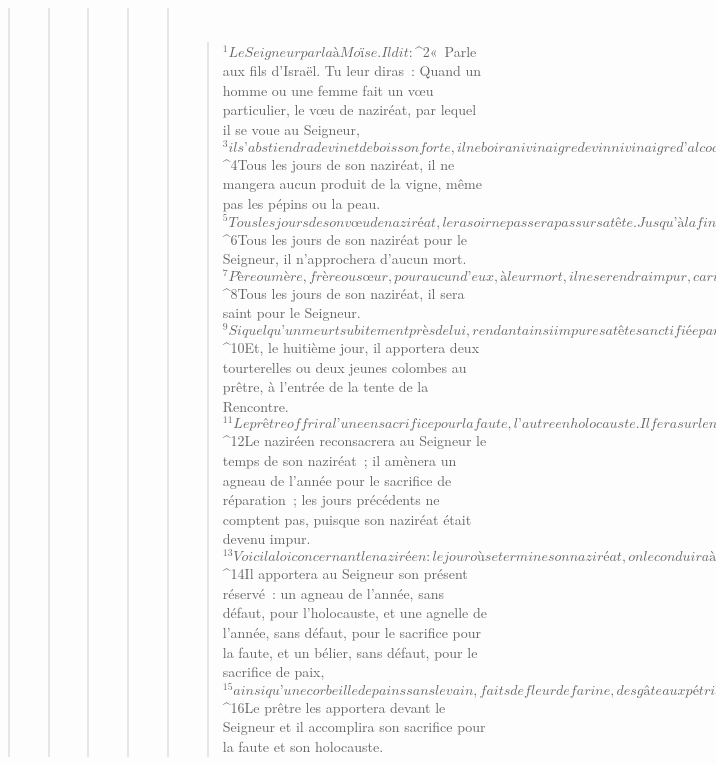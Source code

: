 \begin{verse}
\begin{verse}
\begin{verse}
\begin{verse}
\begin{verse}
         
      \bchapter{}
      \begin{verse}
${}^{1}Le Seigneur parla à Moïse. Il dit : 
${}^{2}« Parle aux fils d’Israël. Tu leur diras : Quand un homme ou une femme fait un vœu particulier, le vœu de naziréat, par lequel il se voue au Seigneur, 
${}^{3}il s’abstiendra de vin et de boisson forte, il ne boira ni vinaigre de vin ni vinaigre d’alcool, il ne boira aucun jus de raisin, il ne mangera ni raisins frais ni raisins secs. 
${}^{4}Tous les jours de son naziréat, il ne mangera aucun produit de la vigne, même pas les pépins ou la peau. 
${}^{5}Tous les jours de son vœu de naziréat, le rasoir ne passera pas sur sa tête. Jusqu’à la fin de cette période de naziréat, il sera saint pour le Seigneur, il laissera pousser librement sa chevelure. 
${}^{6}Tous les jours de son naziréat pour le Seigneur, il n’approchera d’aucun mort. 
${}^{7}Père ou mère, frère ou sœur, pour aucun d’eux, à leur mort, il ne se rendra impur, car il porte sur la tête le signe de la consécration à son Dieu.
${}^{8}Tous les jours de son naziréat, il sera saint pour le Seigneur. 
${}^{9}Si quelqu’un meurt subitement près de lui, rendant ainsi impure sa tête sanctifiée par le naziréat, il se rasera la tête le jour de sa purification : le septième jour il la rasera. 
${}^{10}Et, le huitième jour, il apportera deux tourterelles ou deux jeunes colombes au prêtre, à l’entrée de la tente de la Rencontre. 
${}^{11}Le prêtre offrira l’une en sacrifice pour la faute, l’autre en holocauste. Il fera sur le naziréen le rite d’expiation de la faute que celui-ci aura commise en touchant un mort, et ce jour-là le naziréen sanctifiera de nouveau sa tête. 
${}^{12}Le naziréen reconsacrera au Seigneur le temps de son naziréat ; il amènera un agneau de l’année pour le sacrifice de réparation ; les jours précédents ne comptent pas, puisque son naziréat était devenu impur.
${}^{13}Voici la loi concernant le naziréen : le jour où se termine son naziréat, on le conduira à l’entrée de la tente de la Rencontre. 
${}^{14}Il apportera au Seigneur son présent réservé : un agneau de l’année, sans défaut, pour l’holocauste, et une agnelle de l’année, sans défaut, pour le sacrifice pour la faute, et un bélier, sans défaut, pour le sacrifice de paix, 
${}^{15}ainsi qu’une corbeille de pains sans levain, faits de fleur de farine, des gâteaux pétris à l’huile, et des galettes sans levain frottées d’huile, ainsi que l’offrande de céréales et les libations requises. 
${}^{16}Le prêtre les apportera devant le Seigneur et il accomplira son sacrifice pour la faute et son holocauste. 

\end{verse}
\end{verse}
\end{verse}
\end{verse}
\end{verse}
\end{verse}
